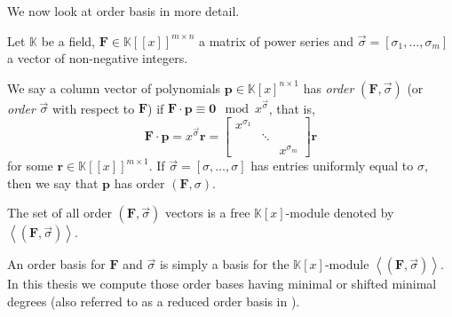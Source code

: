 We now look at order basis in more detail.

Let $\mathbb{K}$ be a field, $\mathbf{F}\in\mathbb{K}\left[\left[x\right]\right]^{m\times n}$
a matrix of power series and $\vec{\sigma}=\left[\sigma_{1},\dots,\sigma_{m}\right]$
a vector of non-negative integers. 
\begin{defn}
We say a column vector of polynomials $\mathbf{p}\in\mathbb{K}\left[x\right]^{n\times1}$
has \emph{order} $\left(\mathbf{F},\vec{\sigma}\right)$ (or \emph{order}
$\vec{\sigma}$ with respect to $\mathbf{F}$) if $\mathbf{F}\cdot\mathbf{p}\equiv\mathbf{0}\mod x^{\vec{\sigma}}$,
that is, 
\[
\mathbf{F}\cdot\mathbf{p}=x^{\vec{\sigma}}\mathbf{r}=\begin{bmatrix}x^{\sigma_{1}}\\
 & \ddots\\
 &  & x^{\sigma_{m}}
\end{bmatrix}\mathbf{r}
\]
 for some $\mathbf{r}\in\mathbb{K}\left[\left[x\right]\right]^{m\times1}$.
If $\vec{\sigma}=\left[\sigma,\dots,\sigma\right]$ has entries uniformly
equal to $\sigma$, then we say that $\mathbf{p}$ has order $\left(\mathbf{F},\sigma\right).$
\begin{comment}
The vector of power series $\mathbf{r}$ is called the order $\left(\mathbf{F},\sigma\right)$-residual
of \textbf{$\mathbf{p}$}. 
\end{comment}
{} The set of all order $\left(\mathbf{F},\vec{\sigma}\right)$ vectors
is a free $\mathbb{K}\left[x\right]$-module denoted by $\left\langle \left(\mathbf{F},\vec{\sigma}\right)\right\rangle $. 
\end{defn}
An order basis for $\mathbf{F}$ and $\vec{\sigma}$ is simply a basis
for the $\mathbb{K}\left[x\right]$-module $\left\langle \left(\mathbf{F},\vec{\sigma}\right)\right\rangle $.
In this thesis we compute those order bases having minimal or shifted
minimal degrees (also referred to as a reduced order basis in \citep{BL1997}).



